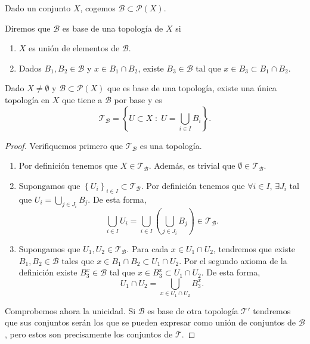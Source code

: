 Dado un conjunto $\displaystyle X $, cogemos $\displaystyle \mathcal{B}\subset \mathcal{P}\left(X\right) $. 
\begin{definition}
Diremos que $\displaystyle \mathcal{B} $ es base de una topología de $\displaystyle X $ si 
\begin{enumerate}
\item $\displaystyle X $ es unión de elementos de $\displaystyle \mathcal{B} $.
\item Dados $\displaystyle B_{1}, B_{2} \in \mathcal{B} $ y $\displaystyle x \in B_{1} \cap B_{2} $, existe $\displaystyle B_{3}\in \mathcal{B} $ tal que $\displaystyle x \in B_{3}\subset B_{1}\cap B_{2} $. 
\end{enumerate}
\end{definition}
\begin{prop}
Dado $\displaystyle X \neq \emptyset $ y $\displaystyle \mathcal{B}\subset \mathcal{P}\left(X\right) $ que es base de una topología, existe una única topología en $\displaystyle X $ que tiene a $\displaystyle \mathcal{B} $ por base y es
\[\mathcal{T}_{\mathcal{B}} = \left\{ U \subset X \; : \; U = \bigcup_{i \in I}B_{i}\right\}  .\]
\end{prop}
\begin{proof}
Verifiquemos primero que $\displaystyle \mathcal{T}_{\mathcal{B}} $ es una topología.
\begin{enumerate}
\item Por definición tenemos que $\displaystyle X \in \mathcal{T}_{\mathcal{B}} $. Además, es trivial que $\displaystyle \emptyset \in \mathcal{T}_{\mathcal{B}} $. 
\item Supongamos que $\displaystyle \left\{ U_{i}\right\} _{i \in I}\subset \mathcal{T}_{\mathcal{B}} $. Por definición tenemos que $\displaystyle \forall i \in I $, $\displaystyle \exists J_{i} $ tal que $\displaystyle U_{i}=\bigcup_{j \in J_{i}}B_{j} $. De esta forma, 
	\[\bigcup_{i \in I}U_{i}=\bigcup_{i \in I}\left(\bigcup_{j \in J_{i}}B_{j}\right) \in \mathcal{T}_{\mathcal{B}} .\]
\item Supongamos que $\displaystyle U_{1}, U_{2} \in \mathcal{T}_{\mathcal{B}} $. Para cada $\displaystyle x \in U_{1} \cap U_{2} $, tendremos que existe $\displaystyle B_{1}, B_{2} \in \mathcal{B} $ tales que $\displaystyle x \in B_{1} \cap B_{2} \subset U_{1} \cap U_{2} $. Por el segundo axioma de la definición existe $\displaystyle B^{x}_{3} \in \mathcal{B} $ tal que $\displaystyle x \in B^{x}_{3} \subset U_{1} \cap U_{2} $. De esta forma, 
	\[U_{1} \cap U_{2} = \bigcup_{x \in U_{1} \cap U_{2}}B^{x}_{3} .\]
\end{enumerate}
Comprobemos ahora la unicidad. Si $\displaystyle \mathcal{B} $ es base de otra topología $\displaystyle \mathcal{T}' $ tendremos que sus conjuntos serán los que se pueden expresar como unión de conjuntos de $\displaystyle \mathcal{B} $, pero estos son precisamente los conjuntos de $\displaystyle \mathcal{T} $. 
\end{proof}
